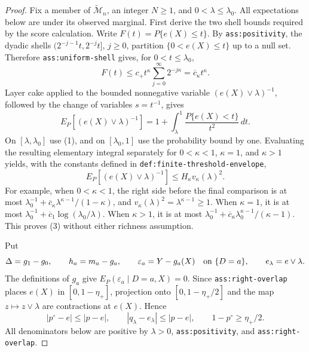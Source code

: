 \documentclass{article}
\begin{document}
\begin{proof}
Fix a member of \(\widetilde{\mathcal M}_n\), an integer \(N\geq1\), and
\(0<\lambda\leq\lambda_0\).  All expectations below are under its observed
marginal.  First derive the two shell bounds required by the score calculation.
Write \(F(t)=P\{e(X)\leq t\}\).  By \texttt{ass:positivity}, the dyadic
shells \((2^{-j-1}t,2^{-j}t]\), \(j\geq0\), partition
\(\{0<e(X)\leq t\}\) up to a null set.  Therefore
\texttt{ass:uniform-shell} gives, for \(0<t\leq\lambda_0\),
\[
F(t)
\leq c_+t^\kappa\sum_{j=0}^\infty2^{-j\kappa}
=\overline c_\kappa t^\kappa.                                      \tag{1}
\]
Layer cake applied to the bounded nonnegative variable
\((e(X)\vee\lambda)^{-1}\), followed by the change of variables
\(s=t^{-1}\), gives
\[
E_P[(e(X)\vee\lambda)^{-1}]
=1+\int_\lambda^1\frac{P\{e(X)<t\}}{t^2}\,dt.                     \tag{2}
\]
On \([\lambda,\lambda_0]\) use (1), and on
\([\lambda_0,1]\) use the probability bound by one.  Evaluating the
resulting elementary integral separately for \(0<\kappa<1\), \(\kappa=1\),
and \(\kappa>1\) yields, with the constants defined in
\texttt{def:finite-threshold-envelope},
\[
E_P[(e(X)\vee\lambda)^{-1}]
\leq H_\kappa v_\kappa(\lambda)^2.                                  \tag{3}
\]
For example, when \(0<\kappa<1\), the right side before the final comparison
is at most
\(\lambda_0^{-1}+\overline c_\kappa\lambda^{\kappa-1}/(1-\kappa)\),
and \(v_\kappa(\lambda)^2=\lambda^{\kappa-1}\geq1\).  When
\(\kappa=1\), it is at most
\(\lambda_0^{-1}+\overline c_1\log(\lambda_0/\lambda)\).  When
\(\kappa>1\), it is at most
\(\lambda_0^{-1}+\overline c_\kappa\lambda_0^{\kappa-1}/(\kappa-1)\).
This proves (3) without either richness assumption.

Put
\[
\Delta=g_1-g_0,\qquad h_a=m_a-g_a,
\qquad \varepsilon_a=Y-g_a(X)\quad\hbox{on }\{D=a\},
\qquad e_\lambda=e\vee\lambda.
\]
The definitions of \(g_a\) give
\(E_P(\varepsilon_a\mid D=a,X)=0\).  Since
\texttt{ass:right-overlap} places \(e(X)\) in
\([0,1-\eta_+]\), projection onto \([0,1-\eta_+/2]\) and the map
\(z\mapsto z\vee\lambda\) are contractions at \(e(X)\).  Hence
\[
|p^\circ-e|\leq|p-e|,
\qquad |q_\lambda-e_\lambda|\leq|p-e|,
\qquad 1-p^\circ\geq\eta_+/2.                                      \tag{4}
\]
All denominators below are positive by \(\lambda>0\),
\texttt{ass:positivity}, and \texttt{ass:right-overlap}.


\end{proof}
\end{document}
